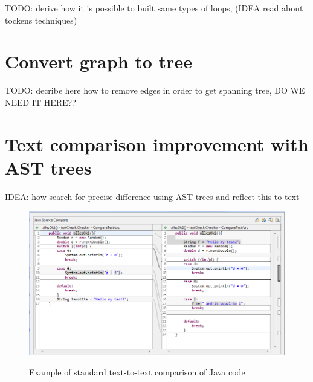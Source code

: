 \documentclass{report}
\begin{document}
TODO: derive how it is possible to built same types of loops, (IDEA read about tockens techniques)

\section{Convert graph to tree}
\label{sec: generate-to-tree}
TODO: decribe here how to remove edges in order to get spanning tree, DO WE NEED IT HERE??


\section{Text comparison improvement with AST trees}
\label{sec:text-improvement}
IDEA: how search for precise difference using AST trees and reflect this to text
\begin{figure}[h]
  \centering
  \includegraphics[scale = 0.5]{Figures/text-to-text/text-compare-shifted.png}\\[0.1cm]
  \caption[Text to text comparison example not optimized]{Example of standard text-to-text comparison of Java code}
  \label{fig:text-to-text-compare-shifted}
\end{figure}
\end{document}
